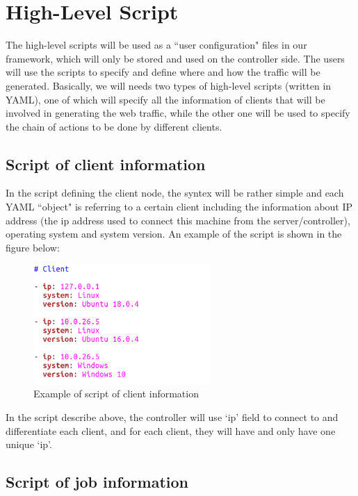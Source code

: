\documentclass[12pt]{report}
\begin{document}
\section{High-Level Script}

The high-level scripts will be used as a ``user configuration" files in our framework, which will only be stored and used on the controller side. The users will use the scripts to specify and define where and how the traffic will be generated. Basically, we will needs two types of high-level scripts (written in YAML), one of which will specify all the information of clients that will be involved in generating the web traffic, while the other one will be used to specify the chain of actions to be done by different clients.

\subsection{Script of client information}

In the script defining the client node, the syntex will be rather simple and each YAML ``object" is referring to a certain client including the information about IP address (the ip address used to connect this machine from the server/controller), operating system and system version. An example of the script is shown in the figure below:\\

\begin{figure}[h!]
	\centering
	\includegraphics[width=0.6\textwidth]{./pictures/client-template}
	\caption{Example of script of client information}
\end{figure}

In the script describe above, the controller will use `ip' field to connect to and differentiate each client, and for each client, they will have and only have one unique `ip'.

\subsection{Script of job information}
\end{document}
